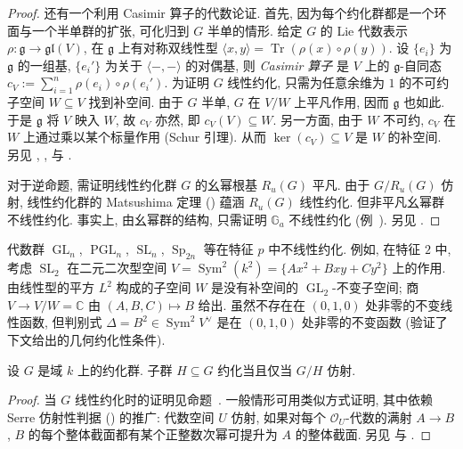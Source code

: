 \begin{proof}
还有一个利用 Casimir 算子的代数论证. 首先, 因为每个约化群都是一个环面与一个半单群的扩张, 可化归到 $G$ 半单的情形. 给定 $G$ 的 Lie 代数表示 $\rho:\mathfrak g\to\mathfrak{gl}(V)$, 在 $\mathfrak g$ 上有对称双线性型 $\langle x,y\rangle=\operatorname{Tr}(\rho(x)\circ\rho(y))$. 设 $\{e_i\}$ 为 $\mathfrak g$ 的一组基, $\{e_i'\}$ 为关于 $\langle-,-\rangle$ 的对偶基, 则 \textit{Casimir 算子} 是 $V$ 上的 $\mathfrak g$-自同态 $c_V:=\sum_{i=1}^n\rho(e_i)\circ\rho(e_i')$. 为证明 $G$ 线性约化, 只需为任意余维为 $1$ 的不可约子空间 $W\subseteq V$ 找到补空间. 由于 $G$ 半单, $G$ 在 $V/W$ 上平凡作用, 因而 $\mathfrak g$ 也如此. 于是 $\mathfrak g$ 将 $V$ 映入 $W$, 故 $c_V$ 亦然, 即 $c_V(V)\subseteq W$. 另一方面, 由于 $W$ 不可约, $c_V$ 在 $W$ 上通过乘以某个标量作用 (Schur 引理). 从而 $\ker(c_V)\subseteq V$ 是 $W$ 的补空间. 另见 \cite[定理 $22.42$]{Mil17}, \cite[\S$4.3$]{Muk03}, \cite[\S$6.2$]{Hum78} 与 \cite[\S$4.5.2$]{DK15}.

对于逆命题, 需证明线性约化群 $G$ 的幺幂根基 $R_u(G)$ 平凡. 由于 $G/R_u(G)$ 仿射, 线性约化群的 Matsushima 定理 () 蕴涵 $R_u(G)$ 线性约化. 但非平凡幺幂群不线性约化. 事实上, 由幺幂群的结构, 只需证明 $\mathbb G_a$ 不线性约化 (例~). 另见 \cite{NM64}.
\end{proof}
\begin{example}\label{src:B.1.47}
代数群 $\operatorname{GL}_n$, $\operatorname{PGL}_n$, $\operatorname{SL}_n$, $\operatorname{Sp}_{2n}$ 等在特征 $p$ 中不线性约化. 例如, 在特征 $2$ 中, 考虑 $\operatorname{SL}_2$ 在二元二次型空间 $V=\operatorname{Sym}^2(k^2)=\{Ax^2+Bxy+Cy^2\}$ 上的作用. 由线性型的平方 $L^2$ 构成的子空间 $W$ 是没有补空间的 $\operatorname{GL}_2$-不变子空间; 商 $V\to V/W=\mathbb C$ 由 $(A,B,C)\mapsto B$ 给出. 虽然不存在在 $(0,1,0)$ 处非零的不变线性函数, 但判别式 $\Delta=B^2\in\operatorname{Sym}^2V^\vee$ 是在 $(0,1,0)$ 处非零的不变函数 (验证了下文给出的几何约化性条件).
\end{example}
\begin{theorem}[Matsushima 定理]\label{src:B.1.48}
设 $G$ 是域 $k$ 上的约化群. 子群 $H\subseteq G$ 约化当且仅当 $G/H$ 仿射.
\end{theorem}
\begin{proof}
当 $G$ 线性约化时的证明见命题~. 一般情形可用类似方式证明, 其中依赖 Serre 仿射性判据 () 的推广: 代数空间 $U$ 仿射, 如果对每个 $\mathcal O_U$-代数的满射 $A\to B$, $B$ 的每个整体截面都有某个正整数次幂可提升为 $A$ 的整体截面. 另见 \cite{Mat60,BB63,Ric77,FS82} 与 \cite[定理 $9.4.1$]{Alp14}.
\end{proof}

